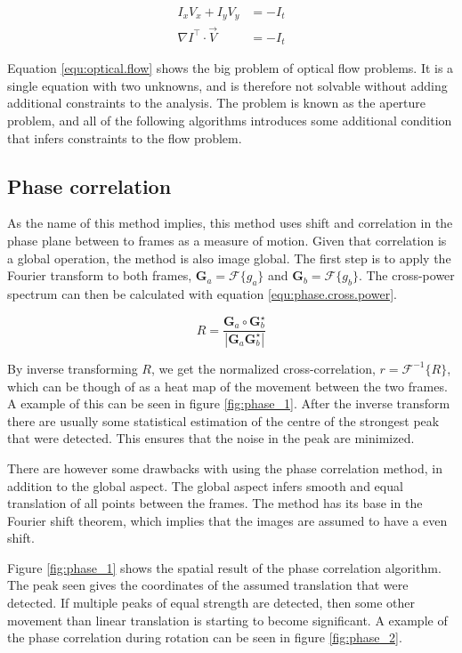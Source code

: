 \begin{align}
	I_x V_x + I_y V_y &= -I_t \label{equ:intensity.deriv} \\
	\nabla I^\top \cdot \vec{V} &= -I_t \label{equ:optical.flow}
\end{align}

Equation \eqref{equ:optical.flow} shows the big problem of optical flow problems. It is a single equation with two unknowns, and is therefore not 
solvable without adding additional constraints to the analysis. The problem is known as the aperture problem, and all of the following algorithms 
introduces some additional condition that infers constraints to the flow problem.

\subsection{Phase correlation}\label{sec:phase.correlation}
As the name of this method implies, this method uses shift and correlation in the phase plane between to frames as a measure of motion. Given that correlation is a global operation,
the method is also image global. The first step is to apply the Fourier transform to both frames, $\textbf{G}_a = \mathcal{F}\{g_a\}$ and $\textbf{G}_b = \mathcal{F}\{g_b\}$. The cross-power spectrum 
can then be calculated with equation \eqref{equ:phase.cross.power}.

\begin{equation}\label{equ:phase.cross.power}
	R = \frac{\textbf{G}_a \circ \textbf{G}_b^\star}{|\textbf{G}_a \textbf{G}_b^\star|}
\end{equation}

By inverse transforming $R$, we get the normalized cross-correlation, $r = \mathcal{F}^{-1}\{R\}$, which can be though of as a 
heat map of the movement between the two frames. A example of this can be seen in figure \ref{fig:phase_1}. After the inverse transform 
there are usually some statistical estimation of the centre of the strongest peak that were detected. This ensures that the
noise in the peak are minimized.

There are however some drawbacks with using the phase correlation method, in addition to the global aspect. The global aspect 
infers smooth and equal translation of all points between the frames. The method has its base 
in the Fourier shift theorem, which implies that the images are assumed to have a even shift.

Figure \ref{fig:phase_1} shows the spatial result of the phase correlation algorithm. The peak seen 
gives the coordinates of the assumed translation that were detected. If multiple peaks of equal strength are 
detected, then some other movement than linear translation is starting to become significant. A example of the 
phase correlation during rotation can be seen in figure \ref{fig:phase_2}.

